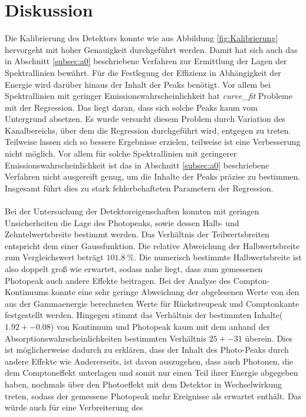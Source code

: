 \section{Diskussion}
\label{sec:Diskussion}
Die Kalibrierung des Detektors konnte wie aus Abbildung \ref{fig:Kalibrierung} hervorgeht mit hoher Genauigkeit durchgeführt werden.
Damit hat sich auch das in Abschnitt \ref{subsec:a0} beschriebene Verfahren zur Ermittlung der Lagen der Spektrallinien bewährt.
Für die Festlegung der Effizienz in Abhängigkeit der Energie wird darüber hinaus der Inhalt der Peaks benötigt.
Vor allem bei Spektrallinien mit geringer Emissionswahrscheinlichkeit hat \textit{curve\_fit} Probleme mit der Regression.
Das liegt daran, dass sich solche Peaks kaum vom Untergrund absetzen.
Es wurde versucht diesem Problem durch Variation des Kanalbereichs, über dem die Regression durchgeführt wird, entgegen zu treten.
Teilweise lassen sich so bessere Ergebnisse erzielen, teilweise ist eine Verbesserung nicht möglich.
Vor allem für solche Spektrallinien mit geringerer Emissionswahrscheinlichkeit ist das in Abschnitt \ref{subsec:a0} beschriebene Verfahren nicht ausgereift genug, um die Inhalte der Peaks präzise zu bestimmen.
Insgesamt führt dies zu stark fehlerbehafteten Parametern der Regression.\\ \\
Bei der Untersuchung der Detektoreigenschaften konnten mit geringen Unsicherheiten die Lage des Photopeaks,
sowie dessen Halb- und Zehntelwertsbreite bestimmt werden. Das Verhältnis der Teilwertsbreiten entspricht
dem einer Gaussfunktion. Die relative Abweichung der Halbwertsbreite
zum Vergleichswert beträgt $\SI{101.8}{\percent}$. Die numerisch bestimmte Halbwertsbreite ist also doppelt groß wie erwartet, sodass nahe liegt, dass zum
gemessenen Photopeak auch andere Effekte beitragen. Bei der Analyse des Compton-Kontinuums konnte eine sehr
geringe Abweichung der abgelesenen Werte von den aus der Gammaenergie berechneten Werte
für Rückstreupeak und Comptonkante festgestellt werden. Hingegen stimmt das Verhältnis der bestimmten Inhalte($1.92+-0.08$) von
Kontinuum und Photopeak kaum mit dem anhand der Absorptionswahrscheinlichkeiten bestimmten Verhältnis $25+-31$ überein.
Dies ist möglicherweise dadurch zu erklären, dass der Inhalt des Photo-Peaks durch andere Effekte wie  Andererseits,
ist davon auszugehen, dass auch Photonen, die dem Comptoneffekt unterlagen und somit nur einen Teil ihrer Energie abgegeben haben, nochmals über den Photoeffekt
mit dem Detektor in Wechselwirkung treten, sodass der gemessene Photopeak mehr Ereignisse als erwartet enthält. Das würde auch für eine Verbreiterung des
